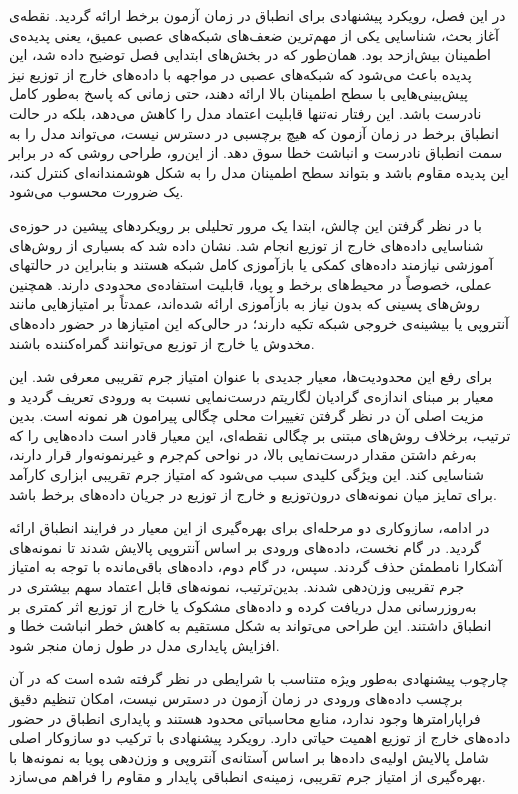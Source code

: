 
در این فصل، رویکرد پیشنهادی برای انطباق در زمان آزمون برخط ارائه گردید. نقطه‌ی آغاز بحث، شناسایی یکی از مهم‌ترین ضعف‌های شبکه‌های عصبی عمیق، یعنی پدیده‌ی اطمینان بیش‌ازحد بود. همان‌طور که در بخش‌های ابتدایی فصل توضیح داده شد، این پدیده باعث می‌شود که شبکه‌های عصبی در مواجهه با داده‌های خارج از توزیع نیز پیش‌بینی‌هایی با سطح اطمینان بالا ارائه دهند، حتی زمانی که پاسخ به‌طور کامل نادرست باشد. این رفتار نه‌تنها قابلیت اعتماد مدل را کاهش می‌دهد، بلکه در حالت انطباق برخط در زمان آزمون که هیچ برچسبی در دسترس نیست، می‌تواند مدل را به سمت انطباق نادرست و انباشت خطا سوق دهد. از این‌رو، طراحی روشی که در برابر این پدیده مقاوم باشد و بتواند سطح اطمینان مدل را به شکل هوشمندانه‌ای کنترل کند، یک ضرورت محسوب می‌شود.  

با در نظر گرفتن این چالش، ابتدا یک مرور تحلیلی بر رویکردهای پیشین در حوزه‌ی شناسایی داده‌های خارج از توزیع انجام شد. نشان داده شد که بسیاری از روش‌های آموزشی نیازمند داده‌های کمکی یا بازآموزی کامل شبکه هستند و بنابراین در حالتهای عملی، خصوصاً در محیط‌های برخط و پویا، قابلیت استفاده‌ی محدودی دارند. همچنین روش‌های پسینی که بدون نیاز به بازآموزی ارائه شده‌اند، عمدتاً بر امتیازهایی مانند آنتروپی یا بیشینه‌ی خروجی شبکه تکیه دارند؛ در حالی‌که این امتیازها در حضور داده‌های مخدوش یا خارج از توزیع می‌توانند گمراه‌کننده باشند.  

برای رفع این محدودیت‌ها، معیار جدیدی با عنوان امتیاز جرم تقریبی معرفی شد. این معیار بر مبنای اندازه‌ی گرادیان لگاریتم درست‌نمایی نسبت به ورودی تعریف گردید و مزیت اصلی آن در نظر گرفتن تغییرات محلی چگالی پیرامون هر نمونه است. بدین ترتیب، برخلاف روش‌های مبتنی بر چگالی نقطه‌ای، این معیار قادر است داده‌هایی را که به‌رغم داشتن مقدار درست‌نمایی بالا، در نواحی کم‌جرم و غیرنمونه‌وار قرار دارند، شناسایی کند. این ویژگی کلیدی سبب می‌شود که امتیاز جرم تقریبی ابزاری کارآمد برای تمایز میان نمونه‌های درون‌توزیع و خارج از توزیع در جریان داده‌های برخط باشد.  

در ادامه، سازوکاری دو مرحله‌ای برای بهره‌گیری از این معیار در فرایند انطباق ارائه گردید. در گام نخست، داده‌های ورودی بر اساس آنتروپی پالایش شدند تا نمونه‌های آشکارا نامطمئن حذف گردند. سپس، در گام دوم، داده‌های باقی‌مانده با توجه به امتیاز جرم تقریبی وزن‌دهی شدند. بدین‌ترتیب، نمونه‌های قابل اعتماد سهم بیشتری در به‌روزرسانی مدل دریافت کرده و داده‌های مشکوک یا خارج از توزیع اثر کمتری بر انطباق داشتند. این طراحی می‌تواند به شکل مستقیم به کاهش خطر انباشت خطا و افزایش پایداری مدل در طول زمان منجر شود.  

چارچوب پیشنهادی به‌طور ویژه متناسب با شرایطی در نظر گرفته شده است که در آن برچسب داده‌های ورودی در زمان آزمون در دسترس نیست، امکان تنظیم دقیق فراپارامترها وجود ندارد، منابع محاسباتی محدود هستند و پایداری انطباق در حضور داده‌های خارج از توزیع اهمیت حیاتی دارد. رویکرد پیشنهادی با ترکیب دو سازوکار اصلی شامل پالایش اولیه‌ی داده‌ها بر اساس آستانه‌ی آنتروپی و وزن‌دهی پویا به نمونه‌ها با بهره‌گیری از امتیاز جرم تقریبی، زمینه‌ی انطباقی پایدار و مقاوم را فراهم می‌سازد.  

